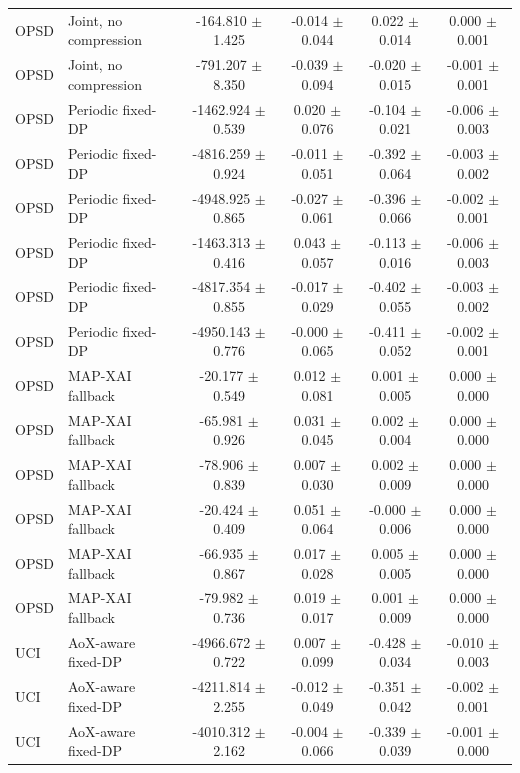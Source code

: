 \begin{tabular}{llcccc}
OPSD & Joint, no compression & -164.810 $\pm$ 1.425 & -0.014 $\pm$ 0.044 & 0.022 $\pm$ 0.014 & 0.000 $\pm$ 0.001 \\
OPSD & Joint, no compression & -791.207 $\pm$ 8.350 & -0.039 $\pm$ 0.094 & -0.020 $\pm$ 0.015 & -0.001 $\pm$ 0.001 \\
OPSD & Periodic fixed-DP & -1462.924 $\pm$ 0.539 & 0.020 $\pm$ 0.076 & -0.104 $\pm$ 0.021 & -0.006 $\pm$ 0.003 \\
OPSD & Periodic fixed-DP & -4816.259 $\pm$ 0.924 & -0.011 $\pm$ 0.051 & -0.392 $\pm$ 0.064 & -0.003 $\pm$ 0.002 \\
OPSD & Periodic fixed-DP & -4948.925 $\pm$ 0.865 & -0.027 $\pm$ 0.061 & -0.396 $\pm$ 0.066 & -0.002 $\pm$ 0.001 \\
OPSD & Periodic fixed-DP & -1463.313 $\pm$ 0.416 & 0.043 $\pm$ 0.057 & -0.113 $\pm$ 0.016 & -0.006 $\pm$ 0.003 \\
OPSD & Periodic fixed-DP & -4817.354 $\pm$ 0.855 & -0.017 $\pm$ 0.029 & -0.402 $\pm$ 0.055 & -0.003 $\pm$ 0.002 \\
OPSD & Periodic fixed-DP & -4950.143 $\pm$ 0.776 & -0.000 $\pm$ 0.065 & -0.411 $\pm$ 0.052 & -0.002 $\pm$ 0.001 \\
OPSD & MAP-XAI fallback & -20.177 $\pm$ 0.549 & 0.012 $\pm$ 0.081 & 0.001 $\pm$ 0.005 & 0.000 $\pm$ 0.000 \\
OPSD & MAP-XAI fallback & -65.981 $\pm$ 0.926 & 0.031 $\pm$ 0.045 & 0.002 $\pm$ 0.004 & 0.000 $\pm$ 0.000 \\
OPSD & MAP-XAI fallback & -78.906 $\pm$ 0.839 & 0.007 $\pm$ 0.030 & 0.002 $\pm$ 0.009 & 0.000 $\pm$ 0.000 \\
OPSD & MAP-XAI fallback & -20.424 $\pm$ 0.409 & 0.051 $\pm$ 0.064 & -0.000 $\pm$ 0.006 & 0.000 $\pm$ 0.000 \\
OPSD & MAP-XAI fallback & -66.935 $\pm$ 0.867 & 0.017 $\pm$ 0.028 & 0.005 $\pm$ 0.005 & 0.000 $\pm$ 0.000 \\
OPSD & MAP-XAI fallback & -79.982 $\pm$ 0.736 & 0.019 $\pm$ 0.017 & 0.001 $\pm$ 0.009 & 0.000 $\pm$ 0.000 \\
UCI & AoX-aware fixed-DP & -4966.672 $\pm$ 0.722 & 0.007 $\pm$ 0.099 & -0.428 $\pm$ 0.034 & -0.010 $\pm$ 0.003 \\
UCI & AoX-aware fixed-DP & -4211.814 $\pm$ 2.255 & -0.012 $\pm$ 0.049 & -0.351 $\pm$ 0.042 & -0.002 $\pm$ 0.001 \\
UCI & AoX-aware fixed-DP & -4010.312 $\pm$ 2.162 & -0.004 $\pm$ 0.066 & -0.339 $\pm$ 0.039 & -0.001 $\pm$ 0.000 \\

\end{tabular}
